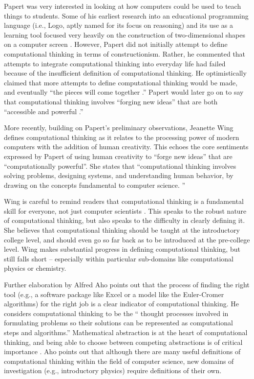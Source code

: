 \documentclass{msuphddissertation}
\begin{document}
\begin{doublespace}
Papert was very interested in looking at how computers could be used to teach things to students.  Some of his earliest research into an educational programming language (i.e., Logo, aptly named for its focus on reasoning) and its use as a learning tool focused very heavily on the construction of two-dimensional shapes on a computer screen \cite{Papert1972}.  However, Papert did not initially attempt to define computational thinking in terms of constructionism.  Rather, he commented that attempts to integrate computational thinking into everyday life had failed because of the insufficient definition of computational thinking.  He optimistically claimed that more attempts to define computational thinking would be made, and eventually ``the pieces will come together \cite{Papert1981}.''  Papert would later go on to say that computational thinking involves ``forging new ideas'' that are both ``accessible and powerful \cite{Papert1996}.''  %

More recently, building on Papert's preliminary observations, Jeanette Wing defines computational thinking as it relates to the processing power of modern computers with the addition of human creativity.  This echoes the core sentiments expressed by Papert of using human creativity to ``forge new ideas'' that are ``computationally powerful''.  She states that ``computational thinking involves solving problems, designing systems, and understanding human behavior, by drawing on the concepts fundamental to computer science. \cite{Wing2006}''

Wing is careful to remind readers that computational thinking is a fundamental skill for everyone, not just computer scientists \cite{Wing2008}.  This speaks to the robust nature of computational thinking, but also speaks to the difficulty in clearly defining it.  She believes that computational thinking should be taught at the introductory college level, and should even go so far back as to be introduced at the pre-college level.  Wing makes substantial progress in defining computational thinking, but still falls short -- especially within particular sub-domains like computational physics or chemistry.

Further elaboration by Alfred Aho points out that the process of finding the right tool (e.g., a software package like Excel or a model like the Euler-Cromer algorithms) for the right job is a clear indicator of computational thinking.  He considers computational thinking to be the `` thought processes involved in formulating problems so their solutions can be represented as computational steps and algorithms.''  Mathematical abstraction is at the heart of computational thinking, and being able to choose between competing abstractions is of critical importance \cite{Aho2012}.  Aho points out that although there are many useful definitions of computational thinking within the field of computer science, new domains of investigation (e.g., introductory physics) require definitions of their own.


\end{doublespace}
\end{document}
